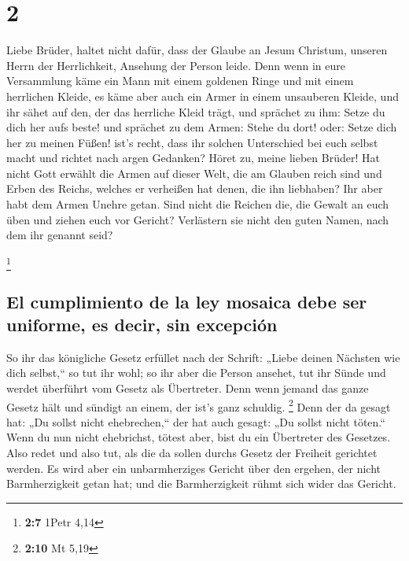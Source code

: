\hypertarget{section-1}{%
\section{2}\label{section-1}}

 Liebe Brüder, haltet nicht dafür, dass der Glaube an
Jesum Christum, unseren Herrn der Herrlichkeit, Ansehung der Person
leide.  Denn wenn in eure Versammlung käme ein Mann mit
einem goldenen Ringe und mit einem herrlichen Kleide, es käme aber auch
ein Armer in einem unsauberen Kleide,  und ihr sähet auf
den, der das herrliche Kleid trägt, und sprächet zu ihm: Setze du dich
her aufs beste! und sprächet zu dem Armen: Stehe du dort! oder: Setze
dich her zu meinen Füßen!  ist's recht, dass ihr solchen
Unterschied bei euch selbst macht und richtet nach argen Gedanken?
 Höret zu, meine lieben Brüder! Hat nicht Gott erwählt die
Armen auf dieser Welt, die am Glauben reich sind und Erben des Reichs,
welches er verheißen hat denen, die ihn liebhaben?  Ihr
aber habt dem Armen Unehre getan. Sind nicht die Reichen die, die Gewalt
an euch üben und ziehen euch vor Gericht?  Verlästern sie
nicht den guten Namen, nach dem ihr genannt seid?

\footnote{\textbf{2:7} 1Petr 4,14}

\hypertarget{el-cumplimiento-de-la-ley-mosaica-debe-ser-uniforme-es-decir-sin-excepciuxf3n}{%
\subsection{El cumplimiento de la ley mosaica debe ser uniforme, es
decir, sin
excepción}\label{el-cumplimiento-de-la-ley-mosaica-debe-ser-uniforme-es-decir-sin-excepciuxf3n}}

 So ihr das königliche Gesetz erfüllet nach der Schrift:
„Liebe deinen Nächsten wie dich selbst,`` so tut ihr wohl;
 so ihr aber die Person ansehet, tut ihr Sünde und werdet
überführt vom Gesetz als Übertreter.  Denn wenn jemand
das ganze Gesetz hält und sündigt an einem, der ist's ganz schuldig.
\footnote{\textbf{2:10} Mt 5,19}  Denn der da gesagt hat:
„Du sollst nicht ehebrechen,`` der hat auch gesagt: „Du sollst nicht
töten.`` Wenn du nun nicht ehebrichst, tötest aber, bist du ein
Übertreter des Gesetzes.  Also redet und also tut, als
die da sollen durchs Gesetz der Freiheit gerichtet werden.
 Es wird aber ein unbarmherziges Gericht über den
ergehen, der nicht Barmherzigkeit getan hat; und die Barmherzigkeit
rühmt sich wider das Gericht.

